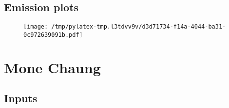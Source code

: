 \documentclass{article}%
\begin{document}
\subsection{Emission plots}%
\label{subsec:Emissionplots}%


\begin{figure}[htbp]%
\centering%
\texttt{[image: /tmp/pylatex-tmp.l3tdvv9v/d3d71734-f14a-4044-ba31-0c972639091b.pdf]}%
\end{figure}

%
\section{Mone Chaung}%
\label{sec:MoneChaung}%
\subsection{Inputs}%
\label{subsec:Inputs}%
\end{document}
